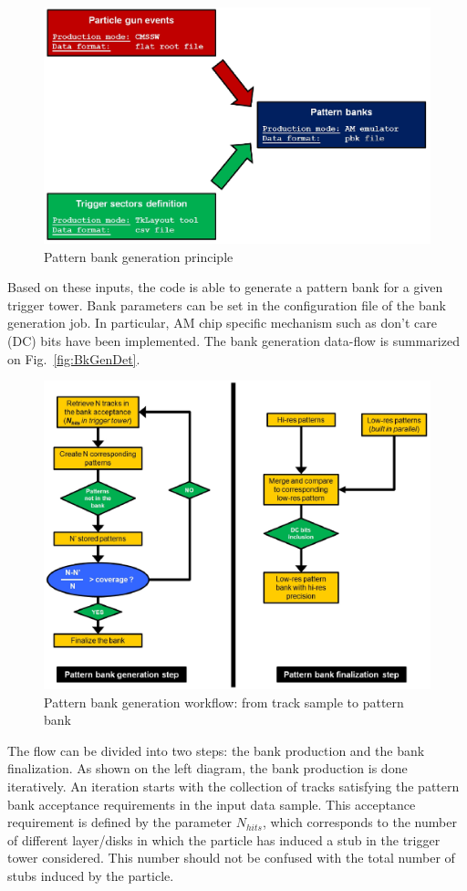\begin{figure}[ht!]
\centering
\includegraphics[width=0.6\columnwidth]{Plots/BankGen.eps}
\caption{Pattern bank generation principle}
\label{fig:BkGen}
\end{figure}

\noindent Based on these inputs, the code is able to generate a pattern bank for a given trigger tower. Bank parameters can be set in the configuration file of the bank generation job. In particular, AM chip specific mechanism such as don't care (DC) bits have been implemented. The bank generation data-flow is summarized on Fig.~\ref{fig:BkGenDet}.

\begin{figure}[ht!]
\centering
\includegraphics[width=0.6\columnwidth]{Plots/BankGenDetail.eps}
\caption{Pattern bank generation workflow: from track sample to pattern bank}
\label{fig:BkGen}
\end{figure}

\noindent The flow can be divided into two steps: the bank production and the bank finalization. As shown on the left diagram, the bank production is done iteratively. An iteration starts with the collection of tracks satisfying the pattern bank acceptance requirements in the input data sample. This acceptance requirement is defined by the parameter $N_{hits}$, which corresponds to the number of different layer/disks in which the particle has induced a stub in the trigger tower considered. This number should not be confused with the total number of stubs induced by the particle.

